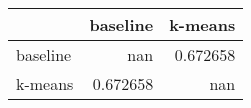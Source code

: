 \begin{tabular}{lrr}
\toprule
          &   baseline &    k-means \\
\midrule
 baseline & nan        &   0.672658 \\
 k-means  &   0.672658 & nan        \\
\bottomrule
\end{tabular}